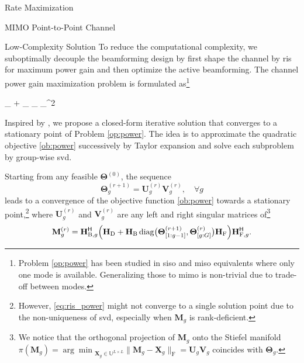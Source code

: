 \documentclass[journal]{IEEEtran}
\begin{document}
\begin{section}{Rate Maximization}
\begin{subsection}{MIMO Point-to-Point Channel}
			\begin{subsubsection}{Low-Complexity Solution}
				\label{sc:rate_pc_lc}
				To reduce the computational complexity, we suboptimally decouple the beamforming design by first shape the channel by \gls{ris} for maximum power gain and then optimize the active beamforming.
				The channel power gain maximization problem is formulated as\footnote{Problem \eqref{op:power} has been studied in \gls{siso} \cite{Shen2020a} and \gls{miso} equivalents \cite{Santamaria2023,Fang2023,Nerini2023,Nerini2023b} where only one mode is available. Generalizing those to \gls{mimo} is non-trivial due to trade-off between modes.}
				\begin{maxi!}
					{\scriptstyle{\mathbf{\Theta}}}{\lVert \mathbf{H}_ + _ \mathbf{\Theta} _\mathrm{F} \rVert _^2}{\label{op:power}}{\label{ob:power}}
				\end{maxi!}
				Inspired by \cite{Nie2017}, we propose a closed-form iterative solution that converges to a stationary point of Problem \eqref{op:power}.
				The idea is to approximate the quadratic objective \eqref{ob:power} successively by Taylor expansion and solve each subproblem by group-wise \gls{svd}.

				\begin{proposition}
					\label{pp:power}
					Starting from any feasible $\mathbf{\Theta}^{(0)}$, the sequence
					\begin{equation}
						\label{eq:ris_power}
						\mathbf{\Theta}_g^{(r+1)} = \mathbf{U}_g^{(r)} \mathbf{V}_g^{(r)}, \quad \forall g
					\end{equation}
					leads to a convergence of the objective function \eqref{ob:power} towards a stationary point,\footnote{However, \eqref{eq:ris_power} might not converge to a single solution point due to the non-uniqueness of \gls{svd}, especially when $\mathbf{M}_g$ is rank-deficient.}
					where $\mathbf{U}_g^{(r)}$ and $\mathbf{V}_g^{(r)}$ are any left and right singular matrices of\footnote{We notice that the orthogonal projection of $\mathbf{M}_g$ onto the Stiefel manifold $\pi(\mathbf{M}_g) = {\arg\min}_{\mathbf{X}_g \in \mathbb{U}^{L \times L}} \lVert \mathbf{M}_g - \mathbf{X}_g \rVert _\mathrm{F} = \mathbf{U}_g \mathbf{V}_g$ coincides with $\mathbf{\Theta}_g$.} %
					\begin{equation}
						\label{eq:auxiliary_power}
						\mathbf{M}_g^{(r)} = \mathbf{H}_{\mathrm{B},g}^\mathsf{H} \Bigl(\mathbf{H}_\mathrm{D} + \mathbf{H}_\mathrm{B} \operatorname{diag}\bigl(\mathbf{\Theta}_{[1:g-1]}^{(r+1)},\mathbf{\Theta}_{[g:G]}^{(r)}\bigr) \mathbf{H}_\mathrm{F}\Bigr) \mathbf{H}_{\mathrm{F},g}^\mathsf{H}.
					\end{equation}
				\end{proposition}


\end{subsubsection}
\end{subsection}
\end{section}
\end{document}
